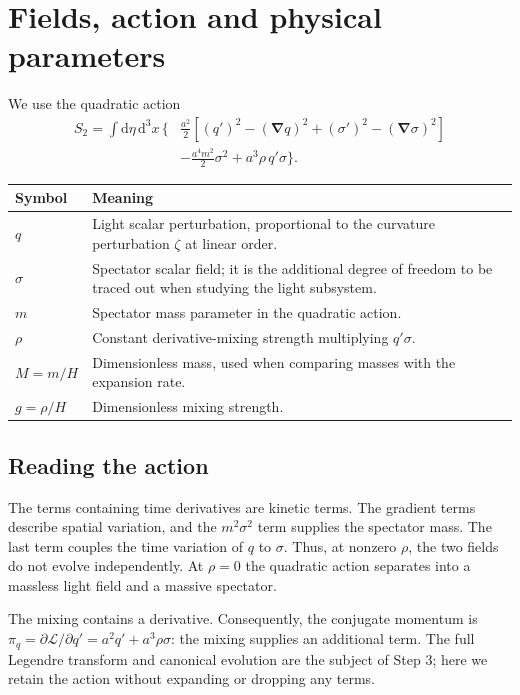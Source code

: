 \documentclass[11pt,a4paper]{article}
\newcommand{\dd}{\mathrm{d}}
\begin{document}
\newpage
\section{Fields, action and physical parameters}
We use the quadratic action
\begin{align}
S_2=\int\dd\eta\,\dd^3x\,\Bigg\{&\frac{a^2}{2}
\left[(q')^2-(\bm{\nabla}q)^2+(\sigma')^2-(\bm{\nabla}\sigma)^2\right]\nonumber\\
&-\frac{a^4m^2}{2}\sigma^2+a^3\rho\,q'\sigma\Bigg\}.
\label{eq:action}
\end{align}
\begin{center}
\begin{tabularx}{\linewidth}{lX}
\toprule
Symbol & Meaning\\
\midrule
$q$ & Light scalar perturbation, proportional to the curvature perturbation $\zeta$ at linear order.\\
$\sigma$ & Spectator scalar field; it is the additional degree of freedom to be traced out when studying the light subsystem.\\
$m$ & Spectator mass parameter in the quadratic action.\\
$\rho$ & Constant derivative-mixing strength multiplying $q'\sigma$.\\
$M=m/H$ & Dimensionless mass, used when comparing masses with the expansion rate.\\
$g=\rho/H$ & Dimensionless mixing strength.\\
\bottomrule
\end{tabularx}
\end{center}

\subsection{Reading the action}
The terms containing time derivatives are kinetic terms. The gradient terms describe spatial variation, and the $m^2\sigma^2$ term supplies the spectator mass. The last term couples the time variation of $q$ to $\sigma$. Thus, at nonzero $\rho$, the two fields do not evolve independently. At $\rho=0$ the quadratic action separates into a massless light field and a massive spectator.

The mixing contains a derivative. Consequently, the conjugate momentum is $\pi_q=\partial\mathcal L/\partial q'=a^2q'+a^3\rho\sigma$: the mixing supplies an additional term. The full Legendre transform and canonical evolution are the subject of Step 3; here we retain the action without expanding or dropping any terms.
\end{document}
